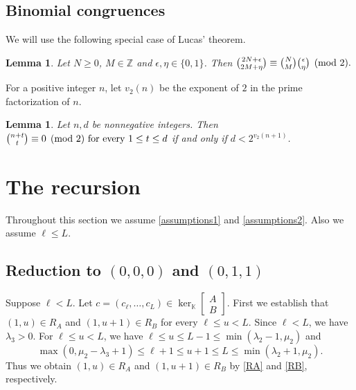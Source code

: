 \documentclass[11pt]{amsart}
\newtheorem{lemma}[theorem]{Lemma}
\theoremstyle{remark}
\theoremstyle{definition}
\newcommand{\la}{\lambda}
\numberwithin{equation}{section}
\begin{document}
	\subsection{Binomial congruences}\label{secbinom}

	We will use the following special case of Lucas' theorem.
	\begin{lemma}\label{lembinom1}
		Let $N\ge0$, $M\in\mathbb Z$ and
		$\epsilon,\eta\in\{0,1\}$. Then
	$
		\tbinom{2N+\epsilon}{2M+\eta}
		\equiv\tbinom NM\tbinom\epsilon\eta\pmod2.$
	\end{lemma}

	For a positive integer $n$, let $v_2(n)$ be the exponent of $2$ in the prime factorization of
	$n$.

	\begin{lemma}\cite[Corollary 22.5]{Jam}\label{lembinom2}
Let $n,d$ be nonnegative integers. Then
$
\tbinom{n+t}{t}\equiv0\pmod2
\ \text{for every }1\le t\le d
$
if and only if $d<2^{v_2(n+1)}$.
	\end{lemma}

\section{The recursion}\label{sec3}
Throughout this section we assume \eqref{assumptions1} and \eqref{assumptions2}. Also we assume $\ell \le L$.

\subsection{Reduction to $(0,0,0)$ and $(0,1,1)$}Suppose $\ell<L$.
Let $c=(c_\ell, \dots, c_L) \in \ker_{\mathbb K}\left[\begin{smallmatrix}A\\B\end{smallmatrix}\right]$. First we establish that $(1,u)\in R_A$ and $(1,u+1)\in R_B$ for every $\ell\le u<L$. Since $\ell<L$, we have $\la_3>0$. For
$\ell\le u<L$, we have
$
\ell\le u\le L-1\le\min(\la_2-1,\mu_2)
$
and
\[
\max(0,\mu_2-\la_3+1)
\le\ell+1\le u+1
\le L\le\min(\la_2+1,\mu_2).
\]
Thus we obtain $(1,u)\in R_A$ and $(1,u+1)\in R_B$
by \eqref{RA} and \eqref{RB}, respectively. 
\end{document}
